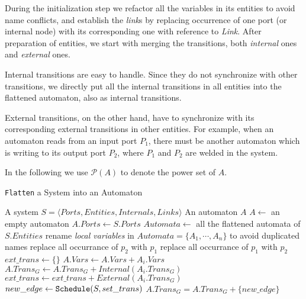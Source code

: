 During the initialization step we refactor all the variables in its entities to avoid name conflicts, and establish the \emph{link}s by replacing occurrence of one port (or internal node) with its corresponding one with reference to \emph{Link}.
After preparation of entities, we start with merging the transitions, both \emph{internal} ones and \emph{external} ones.

Internal transitions are easy to handle. Since they do not synchronize with other transitions, we directly put all the internal transitions in all entities into the flattened automaton, also as internal transitions.

External transitions, on the other hand, have to synchronize with its corresponding external transitions in other entities. For example, when an automaton reads from an input port $P_1$, there must be another automaton which is writing to its output port $P_2$, where $P_1$ and $P_2$ are welded in the system.

In the following we use $\mathcal{P}(A)$ to denote the power set of $A$.

\begin{algorithm}[H]
    \caption{\texttt{Flatten} a System into an Automaton}
    \label{alg:compose}
    \begin{algorithmic}[1]
        \REQUIRE A system $S=\langle Ports, Entities, Internals, Links\rangle$
        \ENSURE An automaton $A$
        \STATE $A \leftarrow $ an empty automaton
        \STATE $A.Ports\leftarrow S.Ports$
        \STATE $Automata\leftarrow$ all the flattened automata of $S.Entities$
        \STATE rename \emph{local variables} in $Automata=\{A_1,\cdots,A_n\}$ to avoid duplicated names
                \STATE replace all occurrance of $p_2$ with $p_1$
            \ELSE
                \STATE replace all occurrance of $p_1$ with $p_2$
            \ENDIF
        \ENDFOR
        \STATE $ext\_trans\leftarrow \{\}$
            \STATE $A.Vars\leftarrow A.Vars + A_i.Vars$
            \STATE $A.Trans_G \leftarrow A.Trans_G + Internal(A_i.Trans_G)$
            \STATE $ext\_trans \leftarrow ext\_trans + External(A_i.Trans_G)$
        \ENDFOR
            \STATE $new\_edge\leftarrow \mbox{\texttt{Schedule}}(S, set\_trans)$ 
                \STATE $A.Trans_G = A.Trans_G + \{new\_edge\}$
            \ENDIF
        \ENDFOR
    \end{algorithmic}
\end{algorithm}

